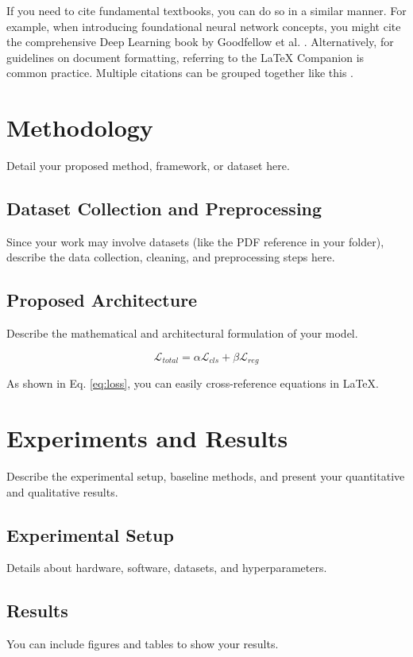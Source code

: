 \documentclass[10pt, twocolumn, a4paper]{article}
\begin{document}
If you need to cite fundamental textbooks, you can do so in a similar manner. For example, when introducing foundational neural network concepts, you might cite the comprehensive Deep Learning book by Goodfellow et al. \cite{goodfellow2016deep}. Alternatively, for guidelines on document formatting, referring to the LaTeX Companion \cite{latex_companion} is common practice. Multiple citations can be grouped together like this \cite{example_dataset_2026, goodfellow2016deep, latex_companion}.

\section{Methodology}
Detail your proposed method, framework, or dataset here. 

\subsection{Dataset Collection and Preprocessing}
Since your work may involve datasets (like the PDF reference in your folder), describe the data collection, cleaning, and preprocessing steps here.

\subsection{Proposed Architecture}
Describe the mathematical and architectural formulation of your model. 

\begin{equation}
    \mathcal{L}_{total} = \alpha \mathcal{L}_{cls} + \beta \mathcal{L}_{reg} \label{eq:loss}
\end{equation}

As shown in Eq. \ref{eq:loss}, you can easily cross-reference equations in LaTeX.

\section{Experiments and Results}
Describe the experimental setup, baseline methods, and present your quantitative and qualitative results.

\subsection{Experimental Setup}
Details about hardware, software, datasets, and hyperparameters.

\subsection{Results}
You can include figures and tables to show your results. 
\end{document}
